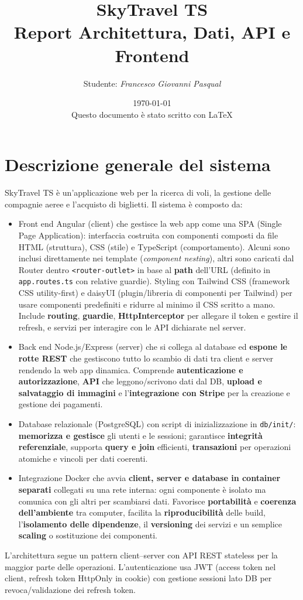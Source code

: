 \documentclass[12pt,a4paper]{article}
\title{SkyTravel TS\\Report Architettura, Dati, API e Frontend}
\author{Studente: \textit{Francesco Giovanni Pasqual}}
\date{\today \\[1ex] \small Questo documento è stato scritto con \LaTeX}
\begin{document}
\maketitle
\tableofcontents
\newpage

\section{Descrizione generale del sistema}
SkyTravel TS è un'applicazione web per la ricerca di voli, la gestione delle compagnie aeree e l'acquisto di biglietti. Il sistema è composto da:
\begin{itemize}[noitemsep]
	\item Front end Angular (client) che gestisce la web app come una SPA (Single Page Application): interfaccia costruita con componenti composti da file HTML (struttura), CSS (stile) e TypeScript (comportamento). Alcuni sono inclusi direttamente nei template (\emph{component nesting}), altri sono caricati dal Router dentro \texttt{<router-outlet>} in base al \textbf{path} dell'URL (definito in \texttt{app.routes.ts} con relative guardie). Styling con Tailwind CSS (framework CSS utility-first) e daisyUI (plugin/libreria di componenti per Tailwind) per usare componenti predefiniti e ridurre al minimo il CSS scritto a mano. Include \textbf{routing}, \textbf{guardie}, \textbf{HttpInterceptor} per allegare il token e gestire il refresh, e servizi per interagire con le API dichiarate nel server.
	\item Back end Node.js/Express (server) che si collega al database ed \textbf{espone le rotte REST} che gestiscono tutto lo scambio di dati tra client e server rendendo la web app dinamica. Comprende \textbf{autenticazione e autorizzazione}, \textbf{API} che leggono/scrivono dati dal DB, \textbf{upload e salvataggio di immagini} e l'\textbf{integrazione con Stripe} per la creazione e gestione dei pagamenti.
	\item Database relazionale (PostgreSQL) con script di inizializzazione in \texttt{db/init/}: \textbf{memorizza e gestisce} gli utenti e le sessioni; garantisce \textbf{integrità referenziale}, supporta \textbf{query e join} efficienti, \textbf{transazioni} per operazioni atomiche e vincoli per dati coerenti.
	\item Integrazione Docker che avvia \textbf{client, server e database in container separati} collegati su una rete interna: ogni componente è isolato ma comunica con gli altri per scambiarsi dati. Favorisce \textbf{portabilità} e \textbf{coerenza dell'ambiente} tra computer, facilita la \textbf{riproducibilità} delle build, l'\textbf{isolamento delle dipendenze}, il \textbf{versioning} dei servizi e un semplice \textbf{scaling} o sostituzione dei componenti.
\end{itemize}
L'architettura segue un pattern client--server con API REST stateless per la maggior parte delle operazioni. L'autenticazione usa JWT (access token nel client, refresh token HttpOnly in cookie) con gestione sessioni lato DB per revoca/validazione dei refresh token.
\end{document}
